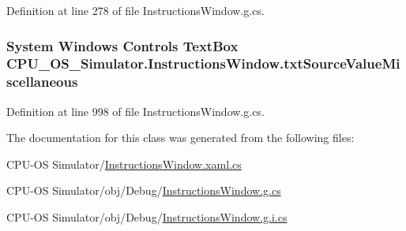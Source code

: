 Definition at line 278 of file Instructions\+Window.\+g.\+cs.

\hypertarget{class_c_p_u___o_s___simulator_1_1_instructions_window_a555d604d5869d89442a35900abc35914}{}
\subsubsection[{txt\+Source\+Value\+Miscellaneous}]{\setlength{\rightskip}{0pt plus 5cm}System Windows Controls Text\+Box C\+P\+U\+\_\+\+O\+S\+\_\+\+Simulator.\+Instructions\+Window.\+txt\+Source\+Value\+Miscellaneous\hspace{0.3cm}{\ttfamily [package]}}\label{class_c_p_u___o_s___simulator_1_1_instructions_window_a555d604d5869d89442a35900abc35914}


Definition at line 998 of file Instructions\+Window.\+g.\+cs.



The documentation for this class was generated from the following files\+:\begin{DoxyCompactItemize}
\item 
C\+P\+U-\/\+O\+S Simulator/\hyperlink{_instructions_window_8xaml_8cs}{Instructions\+Window.\+xaml.\+cs}\item 
C\+P\+U-\/\+O\+S Simulator/obj/\+Debug/\hyperlink{_debug_2_instructions_window_8g_8cs}{Instructions\+Window.\+g.\+cs}\item 
C\+P\+U-\/\+O\+S Simulator/obj/\+Debug/\hyperlink{_debug_2_instructions_window_8g_8i_8cs}{Instructions\+Window.\+g.\+i.\+cs}\end{DoxyCompactItemize}
